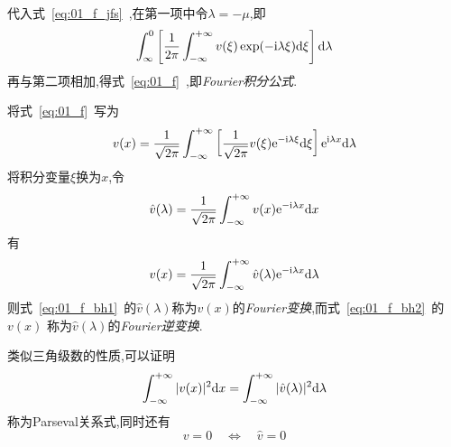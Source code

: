 代入式~\ref{eq:01_f_jfs}~,在第一项中令$\lambda=-\mu$,即
\begin{equation*}
 \int_{\infty}^{0}\left[\dfrac{1}{2\pi}\int_{-\infty}^{+\infty} v(\xi)\exp(-\mathrm{i}\lambda\xi)\mathrm{d}\xi\right]\mathrm{d}\lambda
\end{equation*}
再与第二项相加,得式~\ref{eq:01_f}~,即\emph{Fourier积分公式}.\par
将式~\ref{eq:01_f}~写为
\begin{equation*}
 v(x)=\dfrac{1}{\sqrt{2\pi}}\int_{-\infty}^{+\infty}\left[\dfrac{1}{\sqrt{2\pi}}
 v(\xi)\mathrm{e}^{-\mathrm{i}\lambda\xi}\mathrm{d}\xi\right]\mathrm{e}^{\mathrm{i}\lambda x}\mathrm{d}\lambda
\end{equation*}
将积分变量$\xi$换为$x$,令
\begin{equation}\label{eq:01_f_bh1}
 \hat{v}(\lambda)=\dfrac{1}{\sqrt{2\pi}}\int_{-\infty}^{+\infty}v(x)\mathrm{e}^{-\mathrm{i}\lambda x}\mathrm{d} x
\end{equation}
有
\begin{equation}\label{eq:01_f_bh2}
 v(x)=\dfrac{1}{\sqrt{2\pi}}\int_{-\infty}^{+\infty}\hat{v}(\lambda)\mathrm{e}^{-\mathrm{i}\lambda x}\mathrm{d}\lambda
\end{equation}
则式~\ref{eq:01_f_bh1}~的$\hat{v}(\lambda)$称为$v(x)$的\emph{Fourier变换},而式~\ref{eq:01_f_bh2}~的$v(x)$
称为$\hat{v}(\lambda)$的\emph{Fourier逆变换}.\par
类似三角级数的性质,可以证明
\begin{equation}
 \int_{-\infty}^{+\infty}|v(x)|^2\mathrm{d} x=\int_{-\infty}^{+\infty}|\hat{v}(\lambda)|^2\mathrm{d}\lambda
\end{equation}
称为Parseval关系式,同时还有
\begin{equation}
 v=0\quad\Leftrightarrow\quad \hat{v}=0
\end{equation}
